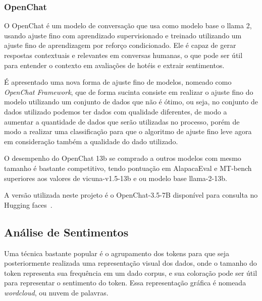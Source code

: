 \subsubsection{OpenChat}
\label{cap:fund_teorica:sec:modelos:subsec:openchat}

O OpenChat \cite{wang2024openchat} é um modelo de conversação que usa como modelo base o llama 2, usando ajuste fino com aprendizado supervisionado e treinado utilizando um ajuste fino de aprendizagem por reforço condicionado. Ele é capaz de gerar respostas contextuais e relevantes em conversas humanas, o que pode ser útil para entender o contexto em avaliações de hotéis e extrair sentimentos.

É apresentado uma nova forma de ajuste fino de modelos, nomeado como \emph{OpenChat Framework}, que de forma sucinta consiste em realizar o ajuste fino do modelo utilizando um conjunto de dados que não é ótimo, ou seja, no conjunto de dados utilizado podemos ter dados com qualidade diferentes, de modo a aumentar a quantidade de dados que serão utilizadas no processo, porém de modo a realizar uma classificação para que o algoritmo de ajuste fino leve agora em consideração também a qualidade do dado utilizado.

O desempenho do OpenChat 13b se comprado a outros modelos com mesmo tamanho é bastante competitivo, tendo pontuação em AlapacaEval e MT-bench superiores aos valores de vicuna-v1.5-13b e ou modelo base llama-2-13b.

A versão utilizada neste projeto é o OpenChat-3.5-7B disponível para consulta no Hugging faces~.

\subsection{Análise de Sentimentos}
\label{cap:fund_teorica:sec:analise_sentimento}



%
Uma técnica bastante popular é o agrupamento dos tokens para que seja posteriormente realizada uma representação visual dos dados, onde o tamanho do token representa sua frequência em um dado corpus, e sua coloração pode ser útil para representar o sentimento do token. Essa representação gráfica é nomeada \emph{wordcloud}, ou nuvem de palavras.

